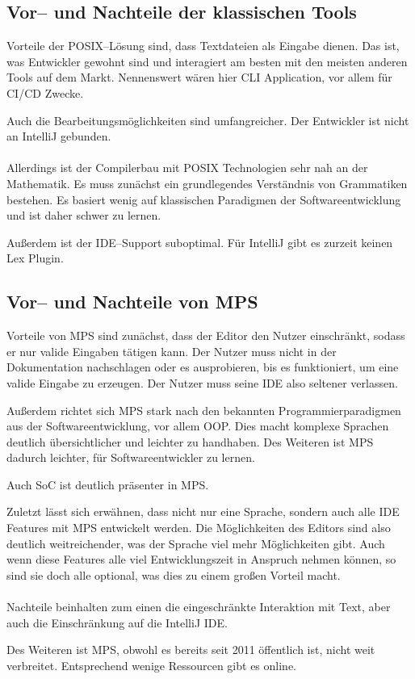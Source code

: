 \subsection{Vor-- und Nachteile der klassischen Tools}\label{subsec:vor---und-nachteile-der-klassischen-tools}
Vorteile der \ac{POSIX}--Lösung sind, dass Textdateien als Eingabe dienen.
Das ist, was Entwickler gewohnt sind und interagiert am besten mit den meisten anderen Tools auf dem Markt.
Nennenswert wären hier \ac{CLI} Application, vor allem für \acs{CI}/\acs{CD} Zwecke.

Auch die Bearbeitungsmöglichkeiten sind umfangreicher.
Der Entwickler ist nicht an IntelliJ gebunden.

\paragraph*{}
Allerdings ist der Compilerbau mit \ac{POSIX} Technologien sehr nah an der Mathematik.
Es muss zunächst ein grundlegendes Verständnis von Grammatiken bestehen.
Es basiert wenig auf klassischen Paradigmen der Softwareentwicklung und ist daher schwer zu lernen.

Außerdem ist der \ac{IDE}--Support suboptimal.
Für IntelliJ gibt es zurzeit keinen Lex Plugin.

\subsection{Vor-- und Nachteile von \acs{MPS}}\label{subsec:vor---und-nachteile-von-mps}
Vorteile von \ac{MPS} sind zunächst, dass der Editor den Nutzer einschränkt, sodass er nur valide Eingaben tätigen kann.
Der Nutzer muss nicht in der Dokumentation nachschlagen oder es ausprobieren, bis es funktioniert, um eine valide Eingabe zu erzeugen.
Der Nutzer muss seine \ac{IDE} also seltener verlassen.

Außerdem richtet sich \ac{MPS} stark nach den bekannten Programmierparadigmen aus der Softwareentwicklung, vor allem \ac{OOP}.
Dies macht komplexe Sprachen deutlich übersichtlicher und leichter zu handhaben.
Des Weiteren ist \ac{MPS} dadurch leichter, für Softwareentwickler zu lernen.

Auch \ac{SoC} ist deutlich präsenter in \ac{MPS}.

Zuletzt lässt sich erwähnen, dass nicht nur eine Sprache, sondern auch alle \ac{IDE} Features mit \ac{MPS} entwickelt werden.
Die Möglichkeiten des Editors sind also deutlich weitreichender, was der Sprache viel mehr Möglichkeiten gibt.
Auch wenn diese Features alle viel Entwicklungszeit in Anspruch nehmen können, so sind sie doch alle optional, was dies zu einem großen Vorteil macht.

\paragraph*{}
Nachteile beinhalten zum einen die eingeschränkte Interaktion mit Text, aber auch die Einschränkung auf die IntelliJ \ac{IDE}.

Des Weiteren ist \ac{MPS}, obwohl es bereits seit 2011 öffentlich ist, nicht weit verbreitet. %
Entsprechend wenige Ressourcen gibt es online.
